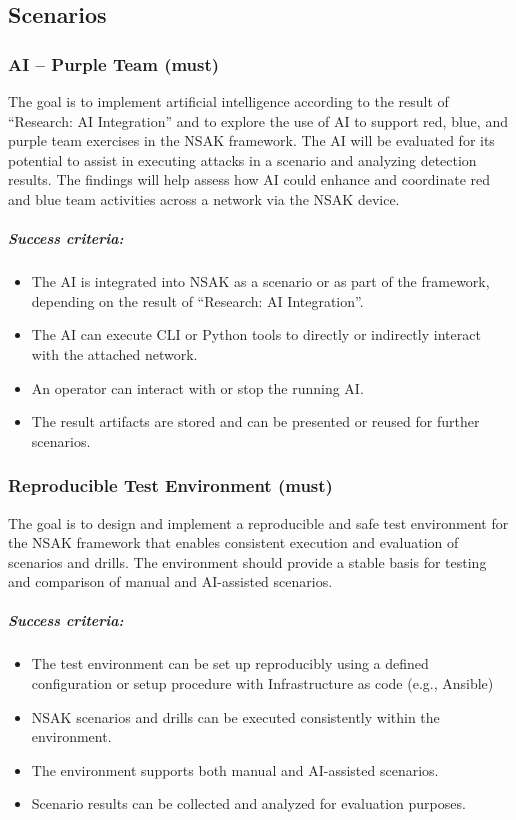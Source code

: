 \subsection{Scenarios}

\subsubsection{AI -- Purple Team (must)}

The goal is to implement artificial intelligence according to the result of ``Research: AI Integration'' and to explore the use of AI to support red, blue, and purple team exercises in the NSAK framework. The AI will be evaluated for its potential to assist in executing attacks in a scenario and analyzing detection results. The findings will help assess how AI could enhance and coordinate red and blue team activities across a network via the NSAK device.

\subparagraph{Success criteria:}

\begin{itemize}
	\item The AI is integrated into NSAK as a scenario or as part of the framework, depending on the result of ``Research: AI Integration''.
	\item The AI can execute CLI or Python tools to directly or indirectly interact with the attached network.
	\item An operator can interact with or stop the running AI.
	\item The result artifacts are stored and can be presented or reused for further scenarios.
\end{itemize}

\subsubsection{Reproducible Test Environment (must)}

The goal is to design and implement a reproducible and safe test environment for the NSAK framework that enables consistent execution and evaluation of scenarios and drills. The environment should provide a stable basis for testing and comparison of manual and AI-assisted scenarios.

\subparagraph{Success criteria:}

\begin{itemize}
	\item The test environment can be set up reproducibly using a defined configuration or setup procedure with Infrastructure as code (e.g., Ansible)
	\item NSAK scenarios and drills can be executed consistently within the environment.
	\item The environment supports both manual and AI-assisted scenarios.
	\item Scenario results can be collected and analyzed for evaluation purposes.
\end{itemize}
\newpage
